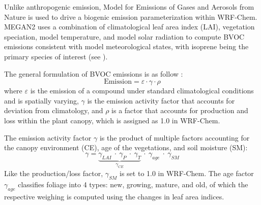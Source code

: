 	Unlike anthropogenic emission, Model for Emissions of Gases and Aerosols from Nature \citep[MEGAN2;][]{Guenther:2006kl} is used to drive a biogenic emission parameterization within WRF-Chem. MEGAN2 uses a combination of climatological leaf area index (LAI), vegetation speciation, model temperature, and model solar radiation to compute BVOC emissions consistent with model meteorological states, with isoprene being the primary species of interest (see ).
	
	The general formulation of BVOC emissions is as follow \citep[after][]{Guenther:2006kl}:
	\begin{equation}\label{eqn:MEGAN-E}
		\mathrm{Emission} =\varepsilon\cdot\gamma\cdot\rho
	\end{equation}
	where $\varepsilon$ is the emission of a compound under standard climatological conditions and is spatially varying,  $\gamma$ is the emission activity factor that accounts for deviation from climatology, and $\rho$ is a factor that accounts for production and loss within the plant canopy, which is assigned as 1.0 in WRF-Chem.
	
	The emission activity factor $\gamma$ is the product of multiple factors accounting for the canopy environment (CE), age of the vegetations, and soil moisture (SM):
	\begin{equation}\label{eqn:MEGAN-gamma}
		\gamma = \underbrace{\gamma_{LAI}~\cdot~\gamma_P~\cdot~\gamma_T}_{\gamma_{CE}}~\cdot~\gamma_{age}~\cdot~\gamma_{SM}
	\end{equation}
	Like the production/loss factor, $\gamma_{SM}$ is set to 1.0 in WRF-Chem. The age factor $\gamma_{age}$ classifies foliage into 4 types: new, growing, mature, and old, of which the respective weighing is computed using the changes in leaf area indices.
	
